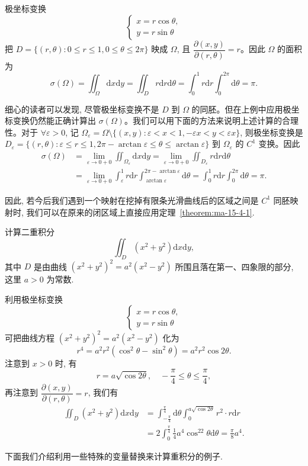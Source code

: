 \begin{solve}
极坐标变换
\[
  \begin{cases}
    x=r\cos\theta,\\
    y=r\sin\theta
  \end{cases}
\]
把 $D=\{(r,\theta):0\leqslant r\leqslant1,0\leqslant\theta\leqslant2\pi\}$ 映成 $\Omega$, 且 $\dfrac{\partial(x,y)}{\partial(r,\theta)}=r$。因此 $\Omega$ 的面积为
\[
  \sigma(\Omega)=\iint_\Omega\mathrm dx\mathrm dy
  =\iint_D r\mathrm dr\mathrm d\theta
  =\int_0^1 r\mathrm dr\int_0^{2\pi}\mathrm d\theta=\pi.
\]

细心的读者可以发现, 尽管极坐标变换不是 $D$ 到 $\Omega$ 的同胚。但在上例中应用极坐标变换仍然能正确计算出 $\sigma(\Omega)$。我们可以用下面的方法来说明上述计算的合理性。对于 $\forall\varepsilon>0$, 记 $\Omega_\varepsilon=\Omega\setminus\{(x,y):\varepsilon<x<1,-\varepsilon x<y<\varepsilon x\}$, 则极坐标变换是 $D_\varepsilon=\{(r,\theta):\varepsilon\leqslant r\leqslant1,2\pi-\arctan\varepsilon\leqslant\theta\leqslant\arctan\varepsilon\}$ 到 $\Omega_\varepsilon$ 的 $C^1$ 变换。因此
\[
\begin{aligned}
  \sigma(\Omega)
  &=\lim_{\varepsilon\to0+0}\iint_{\Omega_\varepsilon}\mathrm dx\mathrm dy
  =\lim_{\varepsilon\to0+0}\iint_{D_\varepsilon}r\mathrm dr\mathrm d\theta\\
  &=\lim_{\varepsilon\to0+0}\int_\varepsilon^1 r\mathrm dr
  \int_{\arctan\varepsilon}^{2\pi-\arctan\varepsilon}\mathrm d\theta
  =\int_0^1 r\mathrm dr\int_0^{2\pi}\mathrm d\theta=\pi.
\end{aligned}
\]

因此, 若今后我们遇到一个映射在挖掉有限条光滑曲线后的区域之间是 $C^1$ 同胚映射时, 我们可以在原来的闭区域上直接应用定理~\ref{theorem:ma-15-4-1}.
\end{solve}


\begin{example}\label{example:ma-15-4-2}
计算二重积分
\[
  \iint_D(x^2+y^2)\mathrm dx\mathrm dy,
\]
其中 $D$ 是由曲线 $(x^2+y^2)^2=a^2(x^2-y^2)$ 所围且落在第一、四象限的部分, 这里 $a>0$ 为常数.
\end{example}


\begin{solve}
利用极坐标变换
\[
  \begin{cases}
    x=r\cos\theta,\\
    y=r\sin\theta
  \end{cases}
\]
可把曲线方程 $(x^2+y^2)^2=a^2(x^2-y^2)$ 化为
\[
  r^4=a^2r^2(\cos^2\theta-\sin^2\theta)=a^2r^2\cos2\theta.
\]
注意到 $x>0$ 时, 有
\[
  r=a\sqrt{\cos2\theta},\quad -\frac\pi4\leqslant\theta\leqslant\frac\pi4,
\]
再注意到 $\dfrac{\partial(x,y)}{\partial(r,\theta)}=r$, 我们有
\[
\begin{aligned}
  \iint_D(x^2+y^2)\mathrm dx\mathrm dy
  &=\int_{-\frac\pi4}^{\frac\pi4}\mathrm d\theta
  \int_0^{a\sqrt{\cos2\theta}}r^2\cdot r\mathrm dr\\
  &=2\int_0^{\frac\pi4}\frac14a^4\cos^22\theta\mathrm d\theta
  =\frac\pi8a^4.
\end{aligned}
\]

下面我们介绍利用一些特殊的变量替换来计算重积分的例子.
\end{solve}


